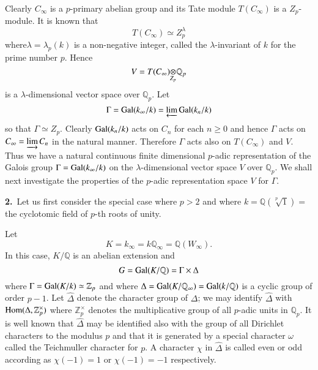 Clearly $C_{\infty}$ is a $p$-primary abelian group and its Tate module $T(C_{\infty})$ is a $Z_{p}$-module. It is known that 
$$
T(C_{\infty})\simeq Z^{\lambda}_{p}
$$
where\pageoriginale $\lambda=\lambda_{p}(k)$ is a non-negative integer, called the $\lambda$-invariant of $k$ for the prime number $p$. Hence
$$
\foprod{V=T(C_{\infty})}{\mathbb{Q}_{p}}{Z_{p}}
$$
is a $\lambda$-dimensional vector space over $\mathbb{Q}_{p}$. Let
$$
\Gamma=\operatorname{Gal}(k_{\infty}/k)=\varprojlim \operatorname{Gal}(k_{n}/k)
$$
so that $\Gamma\simeq Z_{p}$. Clearly $\operatorname{Gal}(k_{n}/k)$ acts on $C_{n}$ for each $n\geq 0$ and hence $\Gamma$ acts on $C_{\infty}=\varinjlim C_{n}$ in the natural manner. Therefore $\Gamma$ acts also on $T(C_{\infty})$ and $V$. Thus we have a natural continuous finite dimensional $p$-adic representation of the Galois group $\Gamma=\operatorname{Gal}(k_{\infty}/k)$ on the $\lambda$-dimensional vector space $V$ over $\mathbb{Q}_{p}$. We shall next investigate the properties of the $p$-adic representation space $V$ for $\Gamma$.

\smallskip
{\bf 2.}~Let us first consider the special case where $p>2$ and where $k=\mathbb{Q}(\sqrt[p]{1})=$ the cyclotomic field of $p$-th roots of unity.

Let
$$
K=k_{\infty}=k\mathbb{Q}_{\infty}=\mathbb{Q}(W_{\infty}).
$$
In this case, $K/\mathbb{Q}$ is an abelian extension and
$$
G=\operatorname{Gal}(K/\mathbb{Q})=\Gamma\times \Delta
$$
where $\Gamma=\operatorname{Gal}(K/k)\simeq \mathbb{Z}_{p}$  and where $\Delta=\operatorname{Gal}(K/\mathbb{Q}_{\infty})=\operatorname{Gal}(k/\mathbb{Q})$ is a cyclic group of order $p-1$. Let $\widehat{\Delta}$ denote the character group of $\Delta$; we may identify $\widehat{\Delta}$ with $\operatorname{Hom}(\Delta,\mathbb{Z}^{\times}_{p})$ where $\mathbb{Z}^{\times}_{p}$ denotes the multiplicative group of all $p$-adic units in $\mathbb{Q}_{p}$. It is well known that $\widehat{\Delta}$ may be identified also with the group of all Dirichlet characters to the modulus $p$ and that it is generated by a special character $\omega$ called the Teichmuller character for $p$. A character $\chi$ in $\widehat{\Delta}$ is called even or odd according as $\chi(-1)=1$ or $\chi(-1)=-1$ respectively.

